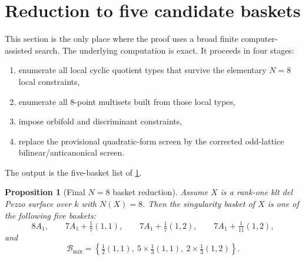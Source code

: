 \documentclass[11pt]{article}
\newtheorem{proposition}[theorem]{Proposition}
\theoremstyle{definition}
\begin{document}
\section{Reduction to five candidate baskets}\label{sec:baskets}

This section is the only place where the proof uses a broad finite computer-assisted search. The underlying computation is exact. It proceeds in four stages:
\begin{enumerate}[label=\textup{(\arabic*)}]
\item enumerate all local cyclic quotient types that survive the elementary $N=8$ local constraints,
\item enumerate all $8$-point multisets built from those local types,
\item impose orbifold and discriminant constraints,
\item replace the provisional quadratic-form screen by the corrected odd-lattice bilinear/anticanonical screen.
\end{enumerate}
The output is the five-basket list of \cref{prop:final-baskets}.

\begin{proposition}[Final $N=8$ basket reduction]\label{prop:final-baskets}
Assume $X$ is a rank-one klt del Pezzo surface over $k$ with $N(X)=8$. Then the singularity basket of $X$ is one of the following five baskets:
\[
8A_1,
\qquad
7A_1+\tfrac17(1,1),
\qquad
7A_1+\tfrac17(1,2),
\qquad
7A_1+\tfrac1{11}(1,2),
\]
and
\[
\mathcal B_{\mathrm{mix}}=\left\{\tfrac12(1,1),\ 5\times\tfrac13(1,1),\ 2\times\tfrac13(1,2)\right\}.
\]
\end{proposition}
\end{document}
